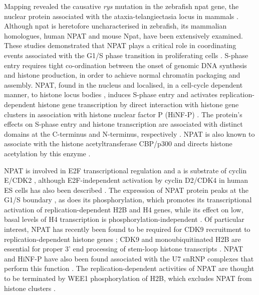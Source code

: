 Mapping revealed the causative \textit{rys} mutation in the zebrafish npat gene, the nuclear protein associated with the ataxia-telangiectasia locus in mammals \cite{Imai1996}. Although npat is heretofore uncharacterised in zebrafish, its mammalian homologues, human NPAT and mouse Npat, have been extensively examined. These studies demonstrated that NPAT plays a critical role in coordinating events associated with the G1/S phase transition in proliferating cells \cite{Ye2003}. S-phase entry requires tight co-ordination between the onset of genomic DNA synthesis and histone production, in order to achieve normal chromatin packaging and assembly. NPAT, found in the nucleus \cite{Sagara2002} and localised, in a cell-cycle dependent manner, to histone locus bodies \cite{Ghule2009}, induces S-phase entry \cite{Zhao1998} and activates replication-dependent histone gene transcription by direct interaction with histone gene clusters \cite{Zhao2000} in association with histone nuclear factor P (HiNF-P) \cite{Mitra2003}. The protein’s effects on S-phase entry and histone transcription are associated with distinct domains at the C-terminus and N-terminus, respectively \cite{Wei2003}. NPAT is also known to associate with the histone acetyltransferase CBP/p300 \cite{Wang2004} and directs histone acetylation by this enzyme \cite{He2011}.

NPAT is involved in E2F transcriptional regulation \cite{Gao2003} and a is substrate of cyclin E/CDK2 \cite{Zhao1998}, although E2F-independent activation by cyclin D2/CDK4 in human ES cells has also been described \cite{Becker2010}. The expression of NPAT protein peaks at the G1/S boundary \cite{Zhao1998}, as does its phosphorylation, which promotes its transcriptional activation of replication-dependent H2B \cite{Ma2000} and H4 \cite{Mitra2009} genes, while its effect on low, basal levels of H4 transcription is phosphorylation-independent \cite{Ye2003}. Of particular interest, NPAT has recently been found to be required for CDK9 recruitment to replication-dependent histone genes \cite{Pirngruber2010}; CDK9 and monoubiquitinated H2B are essential for proper 3’ end processing of stem-loop histone transcripts \cite{Pirngruber2009}. NPAT and HiNF-P have also been found associated with the U7 snRNP complexes that perform this function \cite{Ghule2009}. The replication-dependent activities of NPAT are thought to be terminated by WEE1 phosphorylation of H2B, which excludes NPAT from histone clusters \cite{Mahajan2012}.

